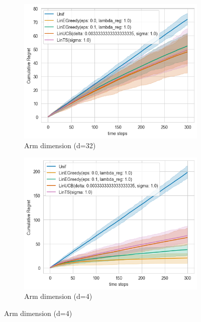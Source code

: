 \begin{figure}[h!]
      \centering
      \begin{subfigure}[b]{0.48\textwidth}
          \centering
          \includegraphics[width=\textwidth]{plots/output.png}
          \caption{Arm dimension (d=32)}
      \end{subfigure}
      \hfill
      \begin{subfigure}[b]{0.48\textwidth}
          \centering
          \includegraphics[width=\textwidth]{plots/output1.png}
          \caption{Arm dimension (d=4)}
      \end{subfigure}
\end{figure}

